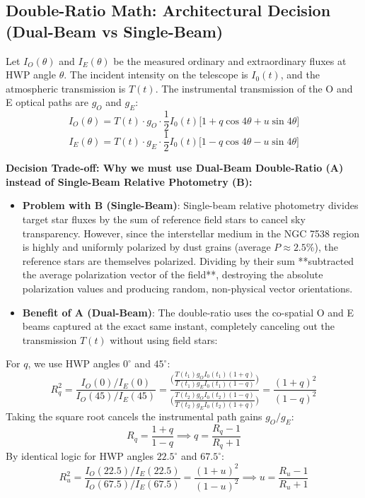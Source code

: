 \documentclass[11pt,a4paper]{article}
\begin{document}
\subsection{Double-Ratio Math: Architectural Decision (Dual-Beam vs Single-Beam)}
Let $I_O(\theta)$ and $I_E(\theta)$ be the measured ordinary and extraordinary fluxes at HWP angle $\theta$. The incident intensity on the telescope is $I_0(t)$, and the atmospheric transmission is $T(t)$. The instrumental transmission of the O and E optical paths are $g_O$ and $g_E$:
\begin{equation}
I_O(\theta) = T(t) \cdot g_O \cdot \frac{1}{2} I_0(t) \Big[ 1 + q \cos 4\theta + u \sin 4\theta \Big]
\end{equation}
\begin{equation}
I_E(\theta) = T(t) \cdot g_E \cdot \frac{1}{2} I_0(t) \Big[ 1 - q \cos 4\theta - u \sin 4\theta \Big]
\end{equation}

\textbf{Decision Trade-off: Why we must use Dual-Beam Double-Ratio (A) instead of Single-Beam Relative Photometry (B):}
\begin{itemize}
    \item \textbf{Problem with B (Single-Beam)}: Single-beam relative photometry divides target star fluxes by the sum of reference field stars to cancel sky transparency. However, since the interstellar medium in the NGC 7538 region is highly and uniformly polarized by dust grains (average $P \approx 2.5\%$), the reference stars are themselves polarized. Dividing by their sum **subtracted the average polarization vector of the field**, destroying the absolute polarization values and producing random, non-physical vector orientations.
    \item \textbf{Benefit of A (Dual-Beam)}: The double-ratio uses the co-spatial O and E beams captured at the exact same instant, completely canceling out the transmission $T(t)$ without using field stars:
\end{itemize}

For $q$, we use HWP angles $0^\circ$ and $45^\circ$:
\begin{equation}
R_q^2 = \frac{I_O(0) / I_E(0)}{I_O(45) / I_E(45)} = \frac{ \Big( \frac{T(t_1) g_O I_0(t_1) (1+q)}{T(t_1) g_E I_0(t_1) (1-q)} \Big) }{ \Big( \frac{T(t_2) g_O I_0(t_2) (1-q)}{T(t_2) g_E I_0(t_2) (1+q)} \Big) } = \frac{(1+q)^2}{(1-q)^2}
\end{equation}
Taking the square root cancels the instrumental path gains $g_O / g_E$:
\begin{equation}
R_q = \frac{1+q}{1-q} \implies q = \frac{R_q - 1}{R_q + 1}
\end{equation}
By identical logic for HWP angles $22.5^\circ$ and $67.5^\circ$:
\begin{equation}
R_u^2 = \frac{I_O(22.5) / I_E(22.5)}{I_O(67.5) / I_E(67.5)} = \frac{(1+u)^2}{(1-u)^2} \implies u = \frac{R_u - 1}{R_u + 1}
\end{equation}
\end{document}
